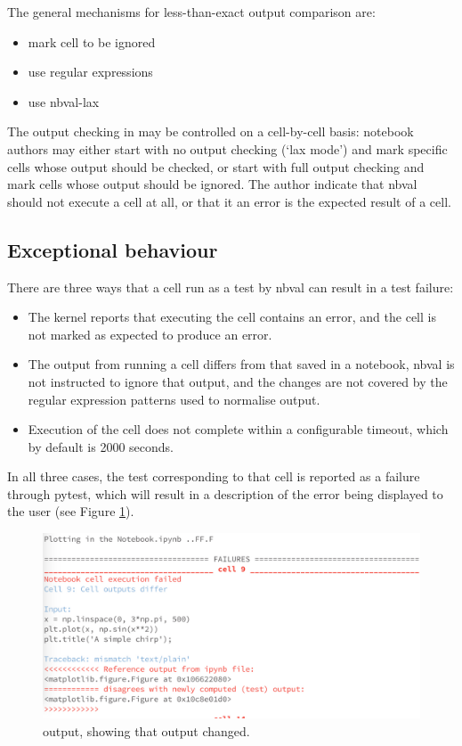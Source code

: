 \documentclass{deliverablereport}
\begin{document}
The general mechanisms for less-than-exact output comparison are:

\begin{itemize}
\item mark cell to be ignored
\item use regular expressions
\item use nbval-lax
\end{itemize}

The output checking in \nbval may be controlled on a cell-by-cell
basis: notebook authors may either start with no output checking (`lax
mode') and mark specific cells whose output should be checked, or
start with full output checking and mark cells whose output should be
ignored.  The author indicate that nbval should not execute a cell at
all, or that it an error is the expected result of a cell.

\subsection{Exceptional behaviour}

There are three ways that a cell run as a test by nbval can result in a test
failure:

\begin{itemize}
\item The kernel reports that executing the cell contains an error,
and the cell is not marked as expected to produce an error.
\item The output from running a cell differs from that saved in a notebook,
nbval is not instructed to ignore that output,
and the changes are not covered by the regular expression patterns used to
normalise output.
\item Execution of the cell does not complete within a configurable timeout,
which by default is 2000 seconds.
\end{itemize}

In all three cases, the test corresponding to that cell is reported as a failure through pytest,
which will result in a description of the error being displayed to the user
(see Figure \ref{fig:nbval}).

\begin{figure}[ht]
  \centering
  \includegraphics[width=1.0\textwidth]{img/nbval-terminal}
  \caption{\nbval output, showing that output changed.}\label{fig:nbval}
\end{figure}
\end{document}
